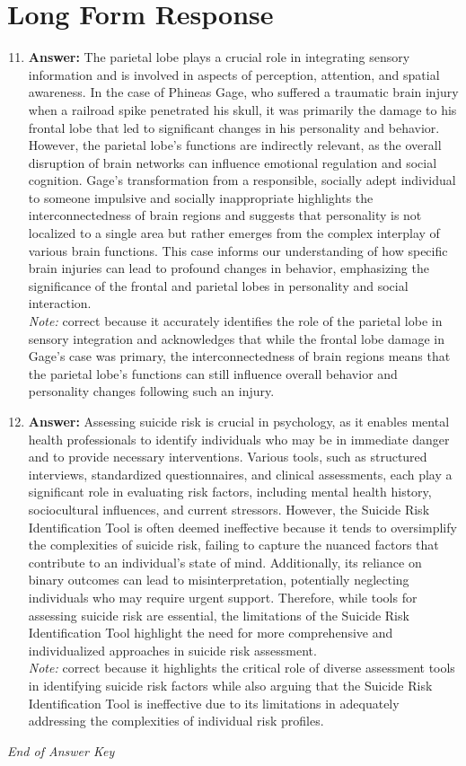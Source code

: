 \documentclass[12pt]{article}
\begin{document}
\section*{Long Form Response}
\begin{enumerate}[label=\arabic*.]
\setcounter{enumi}{10}
\item \textbf{Answer:} The parietal lobe plays a crucial role in integrating sensory information and is involved in aspects of perception, attention, and spatial awareness. In the case of Phineas Gage, who suffered a traumatic brain injury when a railroad spike penetrated his skull, it was primarily the damage to his frontal lobe that led to significant changes in his personality and behavior. However, the parietal lobe's functions are indirectly relevant, as the overall disruption of brain networks can influence emotional regulation and social cognition. Gage's transformation from a responsible, socially adept individual to someone impulsive and socially inappropriate highlights the interconnectedness of brain regions and suggests that personality is not localized to a single area but rather emerges from the complex interplay of various brain functions. This case informs our understanding of how specific brain injuries can lead to profound changes in behavior, emphasizing the significance of the frontal and parietal lobes in personality and social interaction.
\\ \textit{Note:} correct because it accurately identifies the role of the parietal lobe in sensory integration and acknowledges that while the frontal lobe damage in Gage's case was primary, the interconnectedness of brain regions means that the parietal lobe's functions can still influence overall behavior and personality changes following such an injury.
\item \textbf{Answer:} Assessing suicide risk is crucial in psychology, as it enables mental health professionals to identify individuals who may be in immediate danger and to provide necessary interventions. Various tools, such as structured interviews, standardized questionnaires, and clinical assessments, each play a significant role in evaluating risk factors, including mental health history, sociocultural influences, and current stressors. However, the Suicide Risk Identification Tool is often deemed ineffective because it tends to oversimplify the complexities of suicide risk, failing to capture the nuanced factors that contribute to an individual's state of mind. Additionally, its reliance on binary outcomes can lead to misinterpretation, potentially neglecting individuals who may require urgent support. Therefore, while tools for assessing suicide risk are essential, the limitations of the Suicide Risk Identification Tool highlight the need for more comprehensive and individualized approaches in suicide risk assessment.
\\ \textit{Note:} correct because it highlights the critical role of diverse assessment tools in identifying suicide risk factors while also arguing that the Suicide Risk Identification Tool is ineffective due to its limitations in adequately addressing the complexities of individual risk profiles.
\end{enumerate}

\vfill
\noindent\textit{End of Answer Key}
\end{document}

